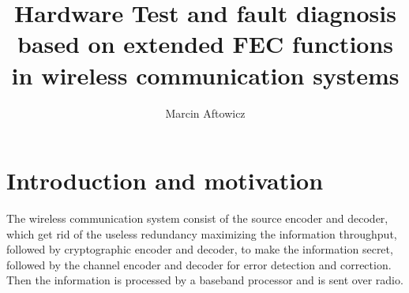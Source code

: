 \documentclass[]{myclass}
\author{Marcin Aftowicz}
\title{Hardware Test and fault diagnosis based on extended FEC functions  in wireless communication systems}
\begin{document}


\frontmatter
\pagestyle{empty}%
\maketitle  \cleardoublepage

   \cleardoublepage

\pagestyle{ppfcmthesis}
    \cleardoublepage

\listoffigures  \cleardoublepage
\listoftables   \cleardoublepage

\tableofcontents \cleardoublepage

\mainmatter
 


\chapter{Introduction and motivation} \label{ch:introduction}
The wireless communication system consist of the source encoder and decoder, which get rid of the useless redundancy maximizing the information throughput, followed by cryptographic encoder and decoder, to make the information secret, followed by the channel encoder and decoder for error detection and correction. Then the information is processed by a baseband processor and is sent over radio. 
%
\end{document}
